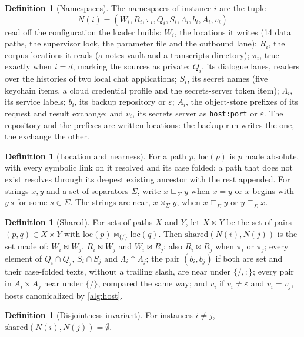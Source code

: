 \documentclass[11pt]{article}
\theoremstyle{plain}
\theoremstyle{definition}
\newtheorem{definition}[theorem]{Definition}
\theoremstyle{remark}
\newcommand{\near}{\bowtie}
\newcommand{\shared}{\mathrm{shared}}
\newcommand{\loc}{\mathrm{loc}}
\begin{document}
\begin{definition}[Namespaces]
The namespaces of instance $i$ are the tuple
\[
  N(i) = (W_i, R_i, \pi_i, Q_i, S_i, \Lambda_i, b_i, A_i, v_i)
\]
read off the configuration the loader builds: $W_i$, the locations it writes (14 data
paths, the supervisor lock, the parameter file and the outbound lane); $R_i$, the corpus locations
it reads (a notes vault and a transcripts directory); $\pi_i$, true exactly when $i = d$, marking
the sources as private; $Q_i$, its dialogue lanes, readers over the histories of two local chat
applications; $S_i$, its secret names (five keychain items, a cloud credential profile and the
secrets-server token item); $\Lambda_i$, its service labels; $b_i$, its backup repository or
$\varepsilon$; $A_i$, the object-store prefixes of its request and result exchange; and $v_i$, its
secrets server as \texttt{host:port} or $\varepsilon$. The repository and the prefixes are
written locations: the backup run writes the one, the exchange the other.
\end{definition}

\begin{definition}[Location and nearness]
For a path $p$, $\loc(p)$ is $p$ made absolute, with every symbolic link on it resolved and its
case folded; a path that does not exist resolves through its deepest existing ancestor with the
rest appended. For strings $x, y$ and a set of separators $\Sigma$, write $x \sqsubseteq_\Sigma y$
when $x = y$ or $x$ begins with $y\,s$ for some $s \in \Sigma$. The strings are near, $x
\near_\Sigma y$, when $x \sqsubseteq_\Sigma y$ or $y \sqsubseteq_\Sigma x$.
\end{definition}

\begin{definition}[Shared]
For sets of paths $X$ and $Y$, let $X \near Y$ be the set of pairs $(p, q) \in X \times Y$ with
$\loc(p) \near_{\{/\}} \loc(q)$. Then $\shared(N(i), N(j))$ is the set made of: $W_i \near W_j$,
$R_i \near W_j$ and $W_i \near R_j$; also $R_i \near R_j$ when $\pi_i$ or $\pi_j$; every element of
$Q_i \cap Q_j$, $S_i \cap S_j$ and $\Lambda_i \cap \Lambda_j$; the pair $(b_i, b_j)$ if both are set
and their case-folded texts, without a trailing slash, are near under $\{/, :\}$; every pair in
$A_i \times A_j$ near under $\{/\}$, compared the same way; and $v_i$ if $v_i \neq \varepsilon$ and
$v_i = v_j$, hosts canonicalized by \cref{alg:host}.
\end{definition}

\begin{definition}[Disjointness invariant]\label{def:invariant}
For instances $i \neq j$, $\shared(N(i), N(j)) = \emptyset$.
\end{definition}
\end{document}
